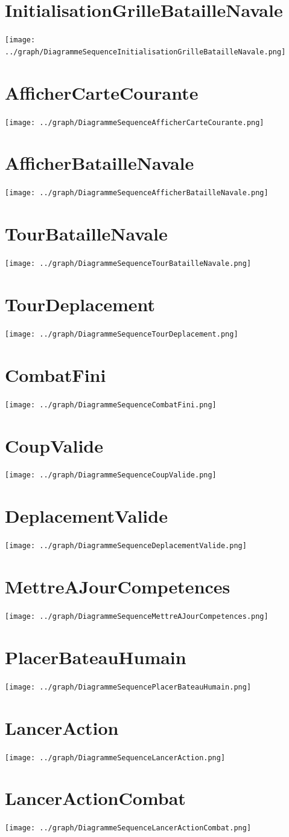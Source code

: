     \section{InitialisationGrilleBatailleNavale}
        \texttt{[image: ../graph/DiagrammeSequenceInitialisationGrilleBatailleNavale.png]}
    \section{AfficherCarteCourante}
        \texttt{[image: ../graph/DiagrammeSequenceAfficherCarteCourante.png]}
    \section{AfficherBatailleNavale}
        \texttt{[image: ../graph/DiagrammeSequenceAfficherBatailleNavale.png]}
    \section{TourBatailleNavale}
        \texttt{[image: ../graph/DiagrammeSequenceTourBatailleNavale.png]}
    \section{TourDeplacement}
        \texttt{[image: ../graph/DiagrammeSequenceTourDeplacement.png]}
    \section{CombatFini}
        \texttt{[image: ../graph/DiagrammeSequenceCombatFini.png]}
    \section{CoupValide}
        \texttt{[image: ../graph/DiagrammeSequenceCoupValide.png]}
    \section{DeplacementValide}
        \texttt{[image: ../graph/DiagrammeSequenceDeplacementValide.png]}
    \section{MettreAJourCompetences}
        \texttt{[image: ../graph/DiagrammeSequenceMettreAJourCompetences.png]}
    \section{PlacerBateauHumain}
        \texttt{[image: ../graph/DiagrammeSequencePlacerBateauHumain.png]}
    \section{LancerAction}
        \texttt{[image: ../graph/DiagrammeSequenceLancerAction.png]}
    \section{LancerActionCombat}
        \texttt{[image: ../graph/DiagrammeSequenceLancerActionCombat.png]}
